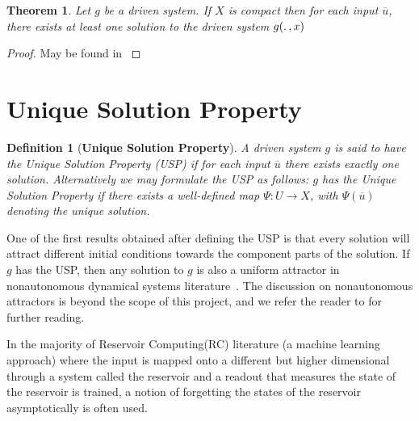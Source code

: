 \documentclass[a4paper,12pt,twoside]{report}
\newtheorem{Definition}{Definition}[]
\newtheorem{Theorem}{Theorem}[]
\begin{document}
\begin{Theorem}\label{Thm_CompactExistence}
 Let $g$ be a driven system.  If $X$ is compact then for each input $\overline{u}$, there exists at least one solution to the driven system $g(\ldotp, x)$
\end{Theorem}
\begin{proof}
  May be found in \cite{kloeden2011nonautonomous, manjunath2014dynamics, manjunath2013echo}
\end{proof}


\section{Unique Solution Property}

\begin{Definition}
  [\bf Unique Solution Property] \label{Dfn_usp}\rm
  A driven system $g$ is said to have the Unique Solution Property (USP) if for each input $\overline{u}$ there exists exactly one solution. 
  Alternatively we may formulate the USP as follows: $g$ has the Unique Solution Property if there exists a well-defined map $\Psi:{U}\to{X}$, with $\Psi({\overline{u}})$ denoting the unique solution.
\end{Definition}

One of the first results obtained after defining the USP is that every solution will attract different initial conditions towards the component parts of the solution.
If $g$ has the USP, then any solution to $g$ is also a uniform attractor in nonautonomous dynamical systems literature~\cite{Manju_Nonlinearity}. The discussion on nonautonomous attractors is beyond the scope of this project, and we refer the reader to \cite{Manju_ESP, esann2012ids} for further reading. 


In the majority of Reservoir Computing(RC) literature (a machine learning approach) where the input is mapped onto a different but higher dimensional through a system called the reservoir and a readout that measures the state of the reservoir is trained, a notion of forgetting the states of the reservoir asymptotically is often used.  
\end{document}
